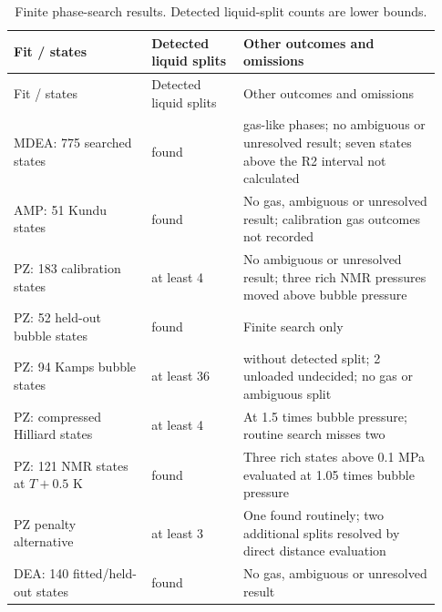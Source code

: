 \begin{longtable}{@{}>{\raggedright\arraybackslash}p{0.3\linewidth}>{\raggedright\arraybackslash}p{0.2\linewidth}>{\raggedright\arraybackslash}p{0.43\linewidth}@{}}
\caption{Finite phase-search results. Detected liquid-split counts are lower bounds.}\label{tab:p2-phase-searches}\\
\toprule Fit / states & Detected liquid splits & Other outcomes and omissions \\ \midrule\endfirsthead
\toprule Fit / states & Detected liquid splits & Other outcomes and omissions \\ \midrule\endhead
\bottomrule\endfoot
MDEA: 775 searched states & 0 found & 37 gas-like phases; no ambiguous or unresolved result; seven states above the R2 interval not calculated \\
AMP: 51 Kundu states & 0 found & No gas, ambiguous or unresolved result; calibration gas outcomes not recorded \\
PZ: 183 calibration states & at least 4 & No ambiguous or unresolved result; three rich NMR pressures moved above bubble pressure \\
PZ: 52 held-out bubble states & 0 found & Finite search only \\
PZ: 94 Kamps bubble states & at least 36 & 56 without detected split; 2 unloaded undecided; no gas or ambiguous split \\
PZ: compressed Hilliard states & at least 4 & At 1.5 times bubble pressure; routine search misses two \\
PZ: 121 NMR states at $T+0.5$ K & 0 found & Three rich states above 0.1 MPa evaluated at 1.05 times bubble pressure \\
PZ penalty alternative & at least 3 & One found routinely; two additional splits resolved by direct distance evaluation \\
DEA: 140 fitted/held-out states & 0 found & No gas, ambiguous or unresolved result \\
\end{longtable}\endgroup
